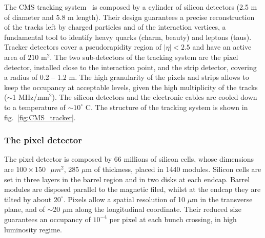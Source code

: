 The CMS tracking system~\cite{Karimäki:368412,Chatrchyan:2014fea} is composed by a cylinder of silicon detectors (2.5 m of diameter and 5.8 m length). Their design guarantees a precise reconstruction of the tracks left by charged particles and of the interaction vertices, a fundamental tool to identify heavy quarks (charm, beauty) and leptons (taus).
Tracker detectors cover a pseudorapidity region of $|\eta|<2.5$ and have an active area of $210\text{ m}^2$. The two sub-detectors of the tracking system are the pixel detector, installed close to the interaction point, and the strip detector, covering a radius of 0.2 -- 1.2 m. The high granularity of the pixels and strips allows to keep the occupancy at acceptable levels, given the high multiplicity of the tracks ($\sim$1 MHz/$\text{mm}^2$). The silicon detectors and the electronic cables are cooled down to a temperature of $\sim 10^{\circ}$ C. The structure of the tracking system is shown in fig.~\ref{fig:CMS_tracker}.

\subsubsection{The pixel detector}
The pixel detector is composed by 66 millions of silicon cells, whose dimensions are $100 \times 150 \text{ }{\mu{m}}^2$, 285 $\mu$m of thickness, placed in 1440 modules. Silicon cells are set in three layers in the barrel region and in two disks at each endcap. Barrel modules are disposed parallel to the magnetic filed, whilst at the endcap they are tilted by about $20^{\circ}$. 
Pixels allow a spatial resolution of 10 $\mu$m in the transverse plane, and of $\sim$20 $\mu$m along the longitudinal coordinate. Their reduced size guarantees an occupancy of $10^{-4}$ per pixel at each bunch crossing, in high luminosity regime.

